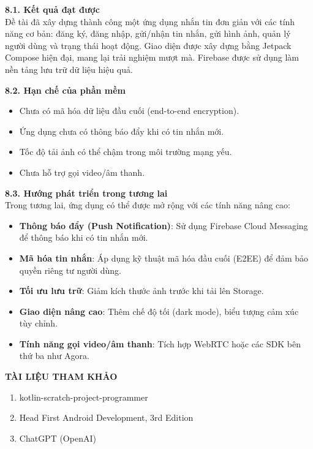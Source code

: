 \documentclass[12pt,a4paper]{article}
\begin{document}
	\textbf{8.1. Kết quả đạt được} \\
	Đề tài đã xây dựng thành công một ứng dụng nhắn tin đơn giản với các tính năng cơ bản: đăng ký, đăng nhập, gửi/nhận tin nhắn, gửi hình ảnh, quản lý người dùng và trạng thái hoạt động. Giao diện được xây dựng bằng Jetpack Compose hiện đại, mang lại trải nghiệm mượt mà. Firebase được sử dụng làm nền tảng lưu trữ dữ liệu hiệu quả.
	
	\textbf{8.2. Hạn chế của phần mềm} \\
	\begin{itemize}
		\item Chưa có mã hóa dữ liệu đầu cuối (end-to-end encryption).
		\item Ứng dụng chưa có thông báo đẩy khi có tin nhắn mới.
		\item Tốc độ tải ảnh có thể chậm trong môi trường mạng yếu.
		\item Chưa hỗ trợ gọi video/âm thanh.
	\end{itemize}
	
	\textbf{8.3. Hướng phát triển trong tương lai} \\
	Trong tương lai, ứng dụng có thể được mở rộng với các tính năng nâng cao:
	\begin{itemize}
		\item \textbf{Thông báo đẩy (Push Notification)}: Sử dụng Firebase Cloud Messaging để thông báo khi có tin nhắn mới.
		\item \textbf{Mã hóa tin nhắn}: Áp dụng kỹ thuật mã hóa đầu cuối (E2EE) để đảm bảo quyền riêng tư người dùng.
		\item \textbf{Tối ưu lưu trữ}: Giảm kích thước ảnh trước khi tải lên Storage.
		\item \textbf{Giao diện nâng cao}: Thêm chế độ tối (dark mode), biểu tượng cảm xúc tùy chỉnh.
		\item \textbf{Tính năng gọi video/âm thanh}: Tích hợp WebRTC hoặc các SDK bên thứ ba như Agora.
	\end{itemize}
	\noindent\textbf{\Large TÀI LIỆU THAM KHẢO}
	
	\vspace{0.5cm}
	
	\begin{enumerate}
		\item kotlin-scratch-project-programmer
		\item Head First Android Development, 3rd Edition
		\item ChatGPT (OpenAI)
	\end{enumerate}
	
	
	
	
	
\end{document}
